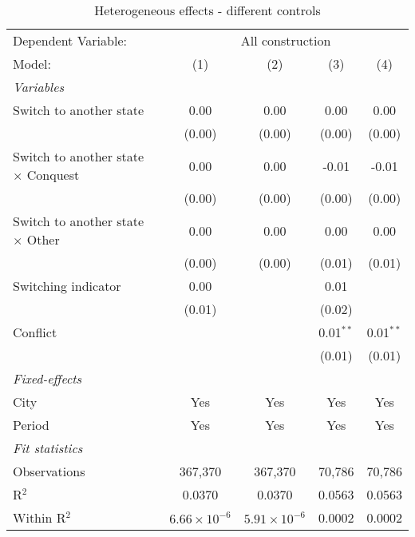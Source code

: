 \begin{table}[htbp]
   \caption{\label{tab:controls_1y} Heterogeneous effects - different controls}
   \centering
   \begin{tabular}{lcccc}
      \tabularnewline \midrule \midrule
      Dependent Variable: & \multicolumn{4}{c}{All construction}\\
      Model:                                     & (1)                   & (2)                   & (3)         & (4)\\  
      \midrule
      \emph{Variables}\\
      Switch to another state                    & 0.00                  & 0.00                  & 0.00        & 0.00\\   
                                                 & (0.00)                & (0.00)                & (0.00)      & (0.00)\\   
      Switch to another state $\times$ Conquest  & 0.00                  & 0.00                  & -0.01       & -0.01\\   
                                                 & (0.00)                & (0.00)                & (0.00)      & (0.00)\\   
      Switch to another state $\times$ Other     & 0.00                  & 0.00                  & 0.00        & 0.00\\   
                                                 & (0.00)                & (0.00)                & (0.01)      & (0.01)\\   
      Switching indicator                        & 0.00                  &                       & 0.01        &   \\   
                                                 & (0.01)                &                       & (0.02)      &   \\   
      Conflict                                   &                       &                       & 0.01$^{**}$ & 0.01$^{**}$\\   
                                                 &                       &                       & (0.01)      & (0.01)\\   
      \midrule
      \emph{Fixed-effects}\\
      City                                       & Yes                   & Yes                   & Yes         & Yes\\  
      Period                                     & Yes                   & Yes                   & Yes         & Yes\\  
      \midrule
      \emph{Fit statistics}\\
      Observations                               & 367,370               & 367,370               & 70,786      & 70,786\\  
      R$^2$                                      & 0.0370                & 0.0370                & 0.0563      & 0.0563\\  
      Within R$^2$                               & $6.66\times 10^{-6}$  & $5.91\times 10^{-6}$  & 0.0002      & 0.0002\\  
      \midrule \midrule
      

\end{tabular}
\end{table}
